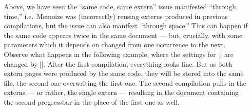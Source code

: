 \documentclass[a4paper,11pt]{article}
\begin{document}
Above, we have seen the ``same code, same extern'' issue manifested ``through
time,'' i.e.\ Memoize was (incorrectly) reusing externs produced in previous
compilations, but the issue can also manifest ``through space.''  This can
happen if the same code appears twice in the same document --- but, crucially,
with some parameters which it depends on changed from one occurrence to the
next.  Observe what happens in the following example, where the settings for
|\progressbar| are changed by |\progressbarchange|.  After the first
compilation, everything looks fine.  But as both extern pages were produced by
the same code, they will be stored into the same file, the second one
overwriting the first one.  The second compilation pulls in the externs --- or
rather, the single extern --- resulting in the document containing the second
progressbar in the place of the first one as well.

\end{document}

